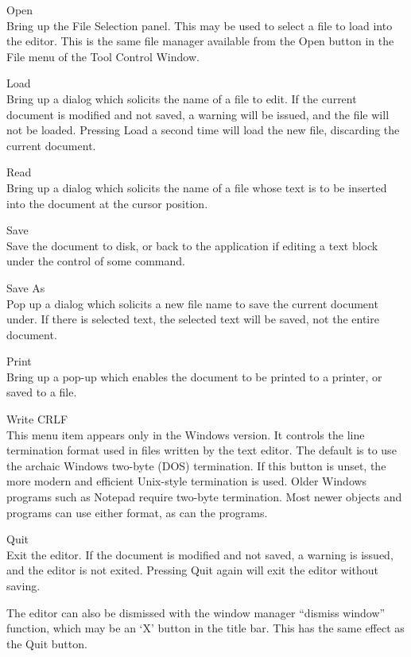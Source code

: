 \begin{description}
\item{\cb Open}\\
Bring up the {\cb File Selection} panel.  This may be used to select a
file to load into the editor.  This is the same file manager available
from the {\cb Open} button in the {\cb File} menu of the {\cb Tool
Control Window}.

\item{\cb Load}\\
Bring up a dialog which solicits the name of a file to edit.  If the
current document is modified and not saved, a warning will be issued,
and the file will not be loaded.  Pressing {\cb Load} a second time
will load the new file, discarding the current document.

\item{\cb Read}\\
Bring up a dialog which solicits the name of a file whose text is to
be inserted into the document at the cursor position.

\item{\cb Save}\\
Save the document to disk, or back to the application if editing a
text block under the control of some command.

\item{\cb Save As}\\
Pop up a dialog which solicits a new file name to save the current
document under.  If there is selected text, the selected text will be
saved, not the entire document.

\item{\cb Print}\\
Bring up a pop-up which enables the document to be printed to a
printer, or saved to a file.

\item{\cb Write CRLF}\\
This menu item appears only in the Windows version.  It controls the
line termination format used in files written by the text editor.  The
default is to use the archaic Windows two-byte (DOS) termination.  If
this button is unset, the more modern and efficient Unix-style
termination is used.  Older Windows programs such as Notepad require
two-byte termination.  Most newer objects and programs can use either
format, as can the {\XicTools} programs.

\item{\cb Quit}\\
Exit the editor.  If the document is modified and not saved, a warning
is issued, and the editor is not exited.  Pressing {\cb Quit} again
will exit the editor without saving.

The editor can also be dismissed with the window manager ``dismiss
window'' function, which may be an `{\cb X}' button in the title bar. 
This has the same effect as the {\cb Quit} button.
\end{description}


